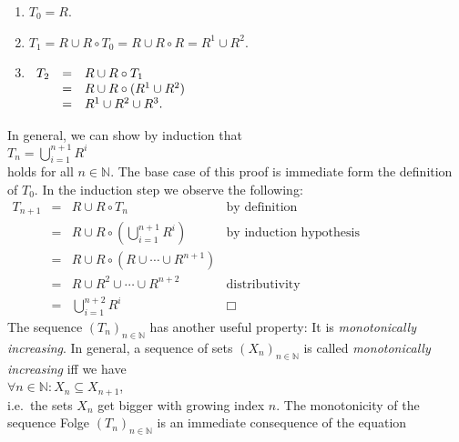 \begin{enumerate}
\item $T_0 = R$.
\item $T_1 = R \cup R \circ T_0 = R \cup R \circ R = R^1 \cup R^2$.
\item$\begin{array}[t]{lcl}
       T_2  & = & R \cup R \circ T_1 \\
            & = & R \cup R \circ (R^1 \cup R^2) \\
            & = & R^1 \cup R^2 \cup R^3. \\
       \end{array}
      $
\end{enumerate}
In general, we can show by induction that
\\[0.2cm]
\hspace*{1.3cm}
$T_n = \bigcup\limits_{i=1}^{n+1} R^i$
\\[0.2cm]
holds for all $n \in \mathbb{N}$.  The base case of this proof is immediate form the definition of $T_0$.
In the induction step we observe the following:
\\[0.2cm]
\hspace*{1.3cm}
$
 \begin{array}{lcll}
   T_{n+1} & = & R \cup R \circ T_n & \mbox{by definition} \\[0.2cm]
           & = & R \cup R \circ \left(\bigcup\limits_{i=1}^{n+1} R^i\right) &
                 \mbox{by induction hypothesis} \\[0.4cm]
           & = & R \cup R \circ \left(R \cup \cdots \cup R^{n+1}\right) \\[0.2cm] 
           & = & R \cup R^2 \cup \cdots \cup R^{n+2}  &
                 \mbox{distributivity} \\[0.2cm]
           & = & \bigcup\limits_{i=1}^{n+2} R^i & \Box 
   \end{array}
$
\\[0.2cm]
The sequence $(T_n)_{n\in\mathbb{N}}$ has another useful property:  It is 
\emph{monotonically increasing}.  In general, a sequence of sets $(X_n)_{n\in\mathbb{N}}$ is called
\emph{monotonically increasing} iff we have
\\[0.2cm]
\hspace*{1.3cm}
$\forall n \in \mathbb{N}: X_n \subseteq X_{n+1}$,
\\[0.2cm]
i.e.~the sets $X_n$ get bigger with growing index $n$.
The monotonicity of the sequence Folge $(T_n)_{n \in \mathbb{N}}$ is an immediate consequence of the equation
\\[0.2cm]
